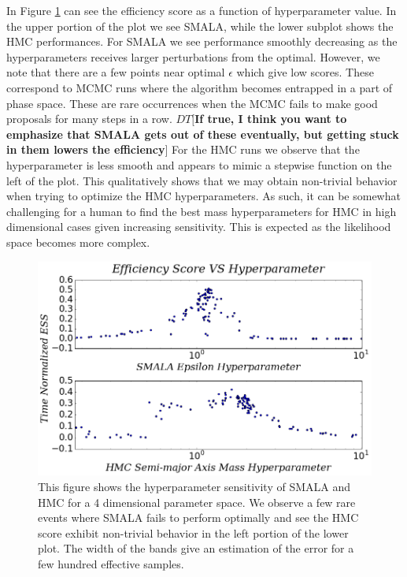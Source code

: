 \documentclass{aa}
\def\memodt#1{\color{green}$DT[${\bf #1}$]$ \color{black}}
\begin{document}
In Figure \ref{sensfig} can see the efficiency score as a function of hyperparameter value. 
In the upper portion of the plot we see SMALA, while the lower subplot shows the HMC performances. For SMALA we see performance smoothly decreasing as the hyperparameters receives larger perturbations from the optimal. 
However, we note that there are a few points near optimal $\epsilon$ which give low scores. 
These correspond to MCMC runs where the algorithm becomes entrapped in a part of phase space. 
These are rare occurrences when the MCMC fails to make good proposals for many steps in a row. \memodt{If true, I think you want to emphasize that SMALA gets out of these eventually, but getting stuck in them lowers the efficiency}
For the HMC runs we observe that the hyperparameter is less smooth and appears to mimic a stepwise function on the left of the plot. 
This qualitatively shows that we may obtain non-trivial behavior when trying to optimize the HMC hyperparameters. 
As such, it can be somewhat challenging for a human to find the best mass hyperparameters for HMC in high dimensional cases given increasing sensitivity. 
This is expected as the likelihood space becomes more complex.

\begin{figure}
\centering
\includegraphics[width=0.95\hsize]{sensitivity-1.png}
   \caption{This figure shows the hyperparameter sensitivity of SMALA and HMC for a 4 dimensional parameter space. 
We observe a few rare events where SMALA fails to perform optimally and see the HMC score exhibit non-trivial behavior in the left portion of the lower plot. 
The width of the bands give an estimation of the error for a few hundred effective samples.}
      \label{sensfig}
\end{figure}
\end{document}
